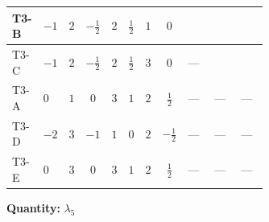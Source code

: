 \documentclass[8pt]{article}
\begin{document}
\begin{landscape}
\begin{longtable}{@{}llcccccc >{\raggedright\arraybackslash}p{0.21\linewidth} >{\raggedright\arraybackslash}p{0.21\linewidth} >{\raggedright\arraybackslash}p{0.21\linewidth}@{}}
T3-B & $-1$ & $2$ & $-\frac{1}{2}$ & $2$ & $\frac{1}{2}$ & $1$ & $0$ & \scriptsize\adjustbox{max width=\linewidth}{$\begin{gathered} {\lambda_5} \left(T_{\nu}^{(1)}+T_{\nu}^{(2)}+6 \operatorname{Tr}\!\left({Y_d}\,\left({Y_d}\right)^{\dagger}\right)+2 \operatorname{Tr}\!\left({Y_e}\,\left({Y_e}\right)^{\dagger}\right)+6 \operatorname{Tr}\!\left({Y_u}\,\left({Y_u}\right)^{\dagger}\right)+\frac{{\lambda_{12}^{(A)}}}{6}+\frac{2 {\lambda_{HS_1}^{(A)}}}{3}+2 {\lambda_{HS_2}^{(A)}}\right)\end{gathered}$} & \scriptsize\adjustbox{max width=\linewidth}{$\begin{gathered} +2 \left({\lambda_7}\right)^{*} \operatorname{Tr}\!\left({y_2}\,\left({y_1}\right)^{\dagger}\right)\end{gathered}$} & \scriptsize\adjustbox{max width=\linewidth}{$\begin{gathered} +2 \left({\lambda_8}\right)^{*} \operatorname{Tr}\!\left({y_1}\,\left({y_2}\right)^{\dagger}\right)\end{gathered}$} \\
\midrule
T3-C & $-1$ & $2$ & $-\frac{1}{2}$ & $2$ & $\frac{1}{2}$ & $3$ & $0$ & --- & \scriptsize\adjustbox{max width=\linewidth}{$\begin{gathered} +3 \left({\lambda_7}\right)^{*} \operatorname{Tr}\!\left({y_2}\,\left({y_1}\right)^{\dagger}\right)\end{gathered}$} & \scriptsize\adjustbox{max width=\linewidth}{$\begin{gathered} +3 \left({\lambda_8}\right)^{*} \operatorname{Tr}\!\left({y_1}\,\left({y_2}\right)^{\dagger}\right)\end{gathered}$} \\
\midrule
T3-A & $0$ & $1$ & $0$ & $3$ & $1$ & $2$ & $\frac{1}{2}$ & --- & --- & --- \\
\midrule
T3-D & $-2$ & $3$ & $-1$ & $1$ & $0$ & $2$ & $-\frac{1}{2}$ & --- & --- & --- \\
\midrule
T3-E & $0$ & $3$ & $0$ & $3$ & $1$ & $2$ & $\frac{1}{2}$ & --- & --- & --- \\
\midrule
\bottomrule
\end{longtable}
\clearpage
\noindent\textbf{Quantity: }$\lambda_5$\par\smallskip

\end{landscape}
\end{document}
